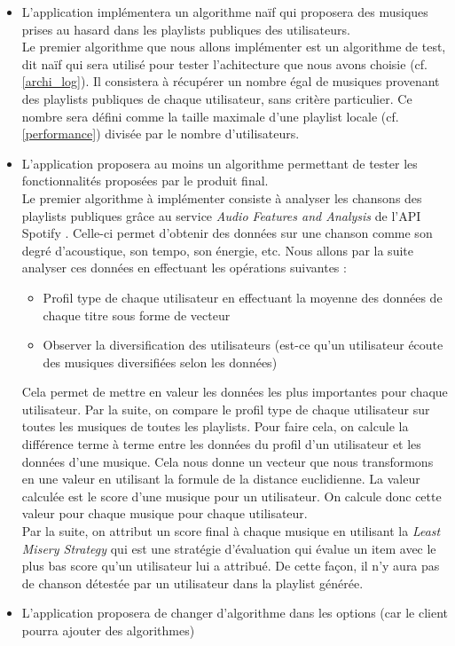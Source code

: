 \documentclass{article}
\begin{document}
		\begin{itemize}
			\item  L'application implémentera un algorithme naïf qui proposera des musiques prises au hasard dans les playlists publiques des utilisateurs.\newline \\
			      Le premier algorithme que nous allons implémenter est un algorithme de test, dit naïf qui sera utilisé pour tester l'achitecture que nous avons choisie (cf. \ref{archi_log}). Il consistera à récupérer un nombre égal de musiques provenant des playlists publiques de chaque utilisateur, sans critère particulier. Ce nombre sera défini comme la taille maximale d'une playlist locale (cf. \ref{performance}) divisée par le nombre d'utilisateurs.
			      		
		      \item  L'application proposera au moins un algorithme \cite{ICDM2017} permettant de tester les fonctionnalités proposées par le produit final.\newline \\
		            Le premier algorithme à implémenter consiste à analyser les chansons des playlists publiques grâce au service \textit{Audio Features and Analysis} de l'API Spotify \cite{spotify-web-api}. Celle-ci permet d'obtenir des données sur une chanson comme son degré d'acoustique, son tempo, son énergie, etc. Nous allons par la suite analyser ces données \cite{Data_analysis} en effectuant les opérations suivantes : 
		            \begin{itemize}
		                \item Profil type de chaque utilisateur en effectuant la moyenne des données de chaque titre sous forme de vecteur
		                \item Observer la diversification des utilisateurs (est-ce qu'un utilisateur écoute des musiques diversifiées selon les données) 
		            \end{itemize}
		            Cela permet de mettre en valeur les données les plus importantes pour chaque utilisateur. Par la suite, on compare le profil type de chaque utilisateur sur toutes les musiques de toutes les playlists. Pour faire cela, on calcule la différence terme à terme entre les données du profil d'un utilisateur et les données d'une musique. Cela nous donne un vecteur que nous transformons en une valeur en utilisant la formule de la distance euclidienne. La valeur calculée est le score d'une musique pour un utilisateur. On calcule donc cette valeur pour chaque musique pour chaque utilisateur. \\
		            Par la suite, on attribut un score final à chaque musique en utilisant la \textit{Least Misery Strategy} \cite{Masthof2011} qui est une stratégie d'évaluation qui évalue un item avec le plus bas score qu'un utilisateur lui a attribué. De cette façon, il n'y aura pas de chanson détestée par un utilisateur dans la playlist générée.
			      
			\item L'application proposera de changer d'algorithme dans les options (car le client pourra ajouter des algorithmes)
		\end{itemize} 
\end{document}

